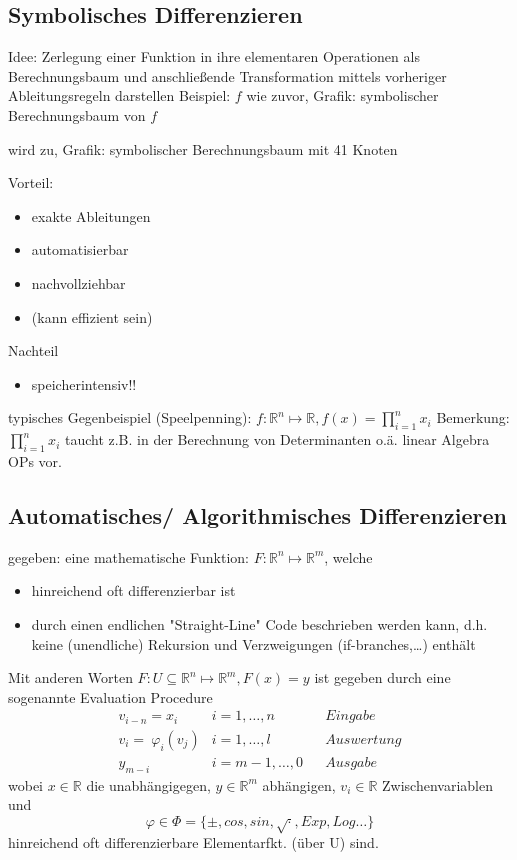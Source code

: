 \vspace{3cm}
\subsection{Symbolisches Differenzieren}
Idee: Zerlegung einer Funktion in ihre elementaren Operationen als Berechnungsbaum und anschließende Transformation mittels vorheriger Ableitungsregeln darstellen
Beispiel: $f$ wie zuvor, Grafik: symbolischer Berechnungsbaum von $f$

\vspace{8cm}

wird zu, Grafik:  symbolischer Berechnungsbaum mit 41 Knoten

\vspace{10cm}

Vorteil:
\begin{itemize}
	\item exakte Ableitungen
	\item automatisierbar
	\item nachvollziehbar
	\item (kann effizient sein)
\end{itemize}
Nachteil
\begin{itemize}
	\item speicherintensiv!!
\end{itemize}
typisches Gegenbeispiel (Speelpenning):
$f:\mathbb{R}^n\mapsto\mathbb{R}, f(x) = \prod_{i=1}^n x_i$
Bemerkung: $\prod_{i=1}^n x_i$ taucht z.B. in der Berechnung von Determinanten o.ä. linear Algebra OPs vor.

\subsection{Automatisches/ Algorithmisches Differenzieren}

gegeben: eine mathematische Funktion: $F:\mathbb{R}^n\mapsto\mathbb{R}^m$, welche
\begin{itemize}
	\item hinreichend oft differenzierbar ist
	\item durch einen endlichen "Straight-Line" Code beschrieben werden kann, d.h. keine (unendliche) Rekursion und Verzweigungen (if-branches,\dots) enthält
\end{itemize}
Mit anderen Worten $F:U\subseteq \mathbb{R}^n\mapsto\mathbb{R}^m, F(x) = y$ ist gegeben durch eine sogenannte Evaluation Procedure
\begin{align*}
	v_{i-n}= x_i & i = 1,\dots,n && Eingabe\\
	v_i = \ \varphi_i(v_j) & i = 1,\dots,l && Auswertung\\
	y_{m-i}& i = m-1,\dots,0 && Ausgabe
\end{align*}
wobei $x \in \mathbb{R}$ die unabhängigegen, $y \in \mathbb{R}^m$ abhängigen, $v_i \in \mathbb{R}$ Zwischenvariablen und 
$$\varphi \in \Phi = \{\pm, cos, sin, \sqrt{\cdot}, Exp, Log \dots \}$$
hinreichend oft differenzierbare Elementarfkt. (über U) sind.


